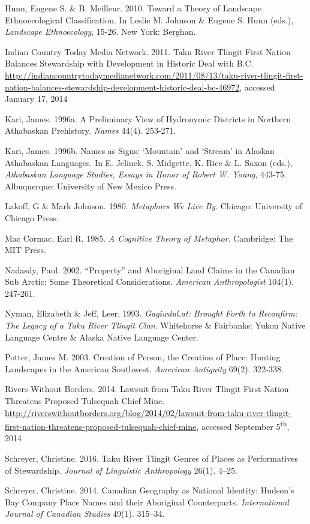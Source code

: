 \begin{hang}
Hunn, Eugene S. \& B. Meilleur. 2010. Toward a Theory of Landscape Ethnoecological Classification. In Leslie M. Johnson \& Eugene S. Hunn (eds.), \textit{Landscape Ethnoecology},  15-26. New York: Berghan.

Indian Country Today Media Network. 2011. Taku River Tlingit First Nation Balances Stewardship with Development in Historic Deal with B.C. \url{http://indiancountrytodaymedianetwork.com/2011/08/13/taku-river-tlingit-first-nation-balances-stewardship-development-historic-deal-bc-46972}, accessed January 17, 2014

Kari, James. 1996a. A Preliminary View of Hydronymic Districts in Northern Athabaskan Prehistory. \textit{Names} 44(4). 253-271.

Kari, James. 1996b.  Names as Signs: ‘Mountain’ and ‘Stream’ in Alaskan Athabaskan Languages. In E.  Jelinek, S. Midgette, K. Rice \& L. Saxon (eds.), \textit{Athabaskan Language Studies, Essays in Honor of Robert W. Young}, 443-75. Albuquerque:  University of New Mexico Press.

Lakoff, G \& Mark Johnson. 1980. \textit{Metaphors We Live By}. Chicago: University of Chicago Press.

Mac Cormac, Earl R. 1985. \textit{A Cognitive Theory of Metaphor}. Cambridge: The MIT Press.

Nadasdy, Paul. 2002. “Property” and Aboriginal Land Claims in the Canadian Sub Arctic: Some  Theoretical Considerations. \textit{American Anthropologist} 104(1). 247-261.

Nyman, Elizabeth \& Jeff, Leer. 1993. \textit{Gagiwdul.at: Brought Forth to Reconfirm: The Legacy of a Taku River Tlingit Clan}.
 Whitehorse \& Fairbanks: Yukon Native Language Centre \& Alaska Native Language Center.

Potter, James M. 2003. Creation of Person, the Creation of Place: Hunting Landscapes in the American Southwest. \textit{American Antiquity} 69(2). 322-338.

Rivers Without Borders. 2014. Lawsuit from Taku River Tlingit First Nation Threatens Proposed Tulsequah Chief  Mine. \url{http://riverswithoutborders.org/blog/2014/02/lawsuit-from-taku-river-tlingit-first-nation-threatens-proposed-tulsequah-chief-mine}, accessed September 5\textsuperscript{th}, 2014

Schreyer, Christine. 2016. Taku River Tlingit Genres of Places as Performatives of Stewardship. \textit{Journal of Linguistic Anthropology} 26(1). 4--25.

Schreyer, Christine. 2014. Canadian Geography as National Identity: Hudson’s Bay Company Place Names and  their Aboriginal Counterparts. \textit{International Journal of Canadian Studies} 49(1). 315--34.


\end{hang}
